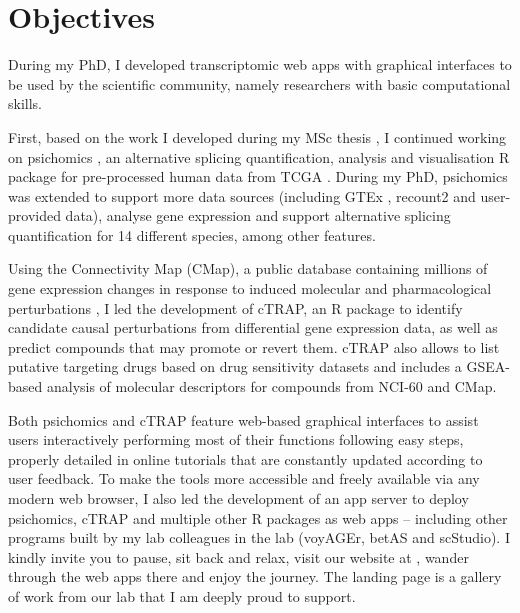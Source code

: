 \chapter{Objectives}

During my PhD, I developed transcriptomic web apps with graphical interfaces to be used by the scientific community, namely researchers with basic computational skills.

First, based on the work I developed during my MSc thesis \cite{saraiva-agostinho:2016vw}, I continued working on psichomics \cite{saraiva-agostinho:2018uq,saraiva-agostinho:2020wz}, an alternative splicing quantification, analysis and visualisation R package for pre-processed human data from TCGA \cite{chang:2013ww}. During my PhD, psichomics was extended to support more data sources (including GTEx \cite{lonsdale:2013uo}, recount2 \cite{collado-torres:2017uw} and user-provided data), analyse gene expression and support alternative splicing quantification for 14 different species, among other features.

Using the Connectivity Map (CMap), a public database containing millions of gene expression changes in response to induced molecular and pharmacological perturbations \cite{subramanian:2017ul}, I led the development of cTRAP, an R package to identify candidate causal perturbations from differential gene expression data, as well as predict compounds that may promote or revert them. cTRAP also allows to list putative targeting drugs based on drug sensitivity datasets and includes a GSEA-based analysis of molecular descriptors for compounds from NCI-60 and CMap.

Both psichomics and cTRAP feature web-based graphical interfaces to assist users interactively performing most of their functions following easy steps, properly detailed in online tutorials that are constantly updated according to user feedback. To make the tools more accessible and freely available via any modern web browser, I also led the development of an app server to deploy psichomics, cTRAP and multiple other R packages as web apps -- including other programs built by my lab colleagues in the lab (voyAGEr, betAS and scStudio). I kindly invite you to pause, sit back and relax, visit our website at , wander through the web apps there and enjoy the journey. The landing page is a gallery of work from our lab that I am deeply proud to support.
